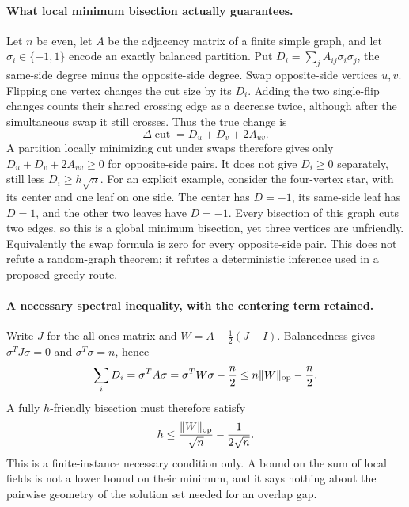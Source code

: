 \documentclass[11pt]{article}
\begin{document}
\paragraph{What local minimum bisection actually guarantees.}
Let $n$ be even, let $A$ be the adjacency matrix of a finite simple graph,
and let $\sigma_i\in\{-1,1\}$ encode an exactly balanced partition.
Put $D_i=\sum_jA_{ij}\sigma_i\sigma_j$, the same-side degree minus the
opposite-side degree. Swap opposite-side vertices $u,v$.
Flipping one vertex changes the cut size by its $D_i$. Adding the two
single-flip changes counts their shared crossing edge as a decrease twice,
although after the simultaneous swap it still crosses. Thus the true change is
\[
 \Delta\operatorname{cut}=D_u+D_v+2A_{uv}.
\]
A partition locally minimizing cut under swaps therefore gives only
$D_u+D_v+2A_{uv}\geq0$ for opposite-side pairs. It does not give
$D_i\geq0$ separately, still less $D_i\geq h\sqrt n$.
For an explicit example, consider the four-vertex star, with its center and
one leaf on one side. The center has $D=-1$, its same-side leaf has $D=1$,
and the other two leaves have $D=-1$. Every bisection of this graph cuts two
edges, so this is a global minimum bisection, yet three vertices are unfriendly.
Equivalently the swap formula is zero for every opposite-side pair.
This does not refute a random-graph theorem; it refutes a deterministic inference
used in a proposed greedy route.

\paragraph{A necessary spectral inequality, with the centering term retained.}
Write $J$ for the all-ones matrix and
$W=A-\frac12(J-I)$. Balancedness gives $\sigma^TJ\sigma=0$ and
$\sigma^T\sigma=n$, hence
\[
 \sum_iD_i=\sigma^TA\sigma=\sigma^TW\sigma-\frac n2
 \leq n\|W\|_{\rm op}-\frac n2.
\]
A fully $h$-friendly bisection must therefore satisfy
\[
 h\leq\frac{\|W\|_{\rm op}}{\sqrt n}-\frac1{2\sqrt n}.
\]
This is a finite-instance necessary condition only. A bound on the sum of local
fields is not a lower bound on their minimum, and it says nothing about the
pairwise geometry of the solution set needed for an overlap gap.
\end{document}
